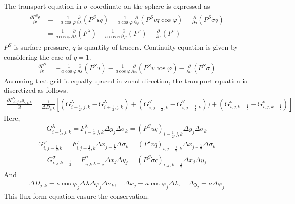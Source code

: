 The transport equation in \(\sigma\) coordinate on the sphere is expressed as \begin{eqnarray}
\begin{aligned}
  \label{b1}
  \frac{\partial P^{S} q}{\partial t} &= - \frac{1}{a \cos \varphi} \frac{\partial}{\partial \lambda}(P^{S} uq)- \frac{1}{a \cos \varphi} \frac{\partial}{\partial \varphi}(P^{S} vq \cos \varphi)- \frac{\partial}{\partial \sigma} (P^{S} \dot{\sigma} q) \\
  &= \frac{1}{a \cos \varphi} \frac{\partial}{\partial \lambda}(F^{\lambda})- \frac{1}{a \cos \varphi} \frac{\partial}{\partial \varphi}(F^{\varphi})- \frac{\partial}{\partial \sigma} (F^{\sigma})\end{aligned}\end{eqnarray}
\(P^{S}\) is surface pressure, \(q\) is quantity of tracers. Continuity equation is given by considering the case of \(q=1\).
\begin{eqnarray}\frac{\partial P^{S}}{\partial t} = - \frac{1}{a \cos \varphi} \frac{\partial}{\partial \lambda}(P^{S}u)- \frac{1}{a \cos \varphi} \frac{\partial}{\partial \varphi}(P^{S}v \cos \varphi)- \frac{\partial}{\partial \sigma} (P^{S} \dot{\sigma})\end{eqnarray}
Assuming that grid is equally spaced in zonal direction, the transport equation is discretized as follows. \begin{eqnarray}\label{a1}
  \frac{\partial P^{S}_{,i,j,k} q_{i,j,k}}{\partial t}=\frac{1}{\Delta D_{j,k}}[(G^{\lambda}_{i-\frac{1}{2},j,k}-G^{\lambda}_{i+\frac{1}{2},j,k})+(G^{\varphi}_{i,j-\frac{1}{2},k}-G^{\varphi}_{i,j+\frac{1}{2},k}))+(G^{\sigma}_{i,j,k-\frac{1}{2}}-G^{\sigma}_{i,j,k+\frac{1}{2}})]\end{eqnarray}
Here, \begin{eqnarray}G^{\lambda}_{i-\frac{1}{2},j,k}=F^{\lambda}_{i-\frac{1}{2},j,k} \Delta y_{j} \Delta \sigma_{k}=(P^{S}uq)_{i-\frac{1}{2},j,k} \Delta y_{j} \Delta \sigma_{k}\end{eqnarray}
\begin{eqnarray}G^{\varphi}_{i,j-\frac{1}{2},k}=F^{\varphi}_{i,j-\frac{1}{2},k} \Delta x_{j-\frac{1}{2}} \Delta \sigma_{k}=(P^{s}vq)_{i,j-\frac{1}{2},k} \Delta x_{j-\frac{1}{2}} \Delta \sigma_{k}\end{eqnarray}
\begin{eqnarray}G^{\sigma}_{i,j,k-\frac{1}{2}}=F^{\eta}_{i,j,k-\frac{1}{2}} \Delta x_{j} \Delta y_{j}=(P^{S} \dot{\sigma} q)_{i,j,k-\frac{1}{2}} \Delta x_{j} \Delta y_{j}\end{eqnarray} And
\begin{eqnarray}\Delta D_{j,k}=a \cos \varphi_{j} \Delta \lambda \Delta \varphi_{j} \Delta \sigma_{k},\quad \Delta x_{j}=a \cos \varphi_{j} \Delta \lambda,\quad \Delta y_{j}=a \Delta \varphi_{j}\end{eqnarray} This flux form
equation ensure the conservation.

